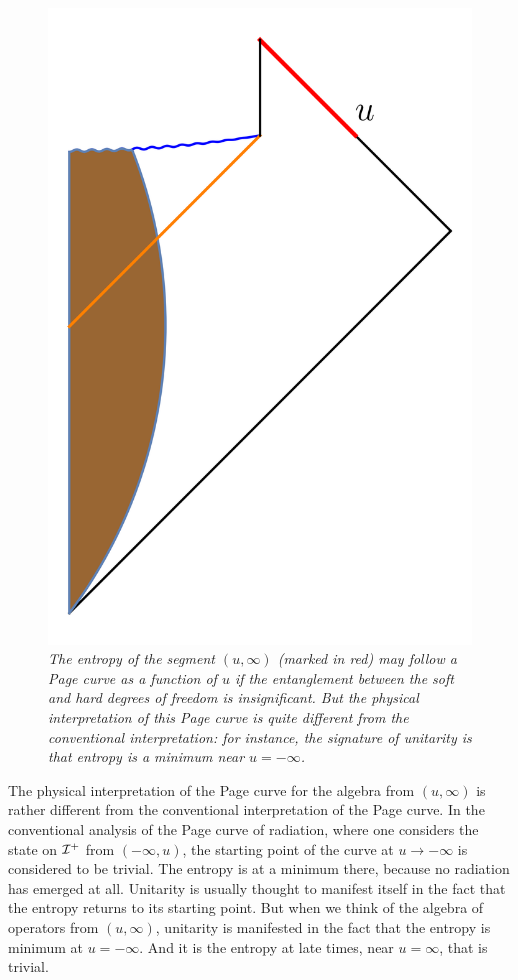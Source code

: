 \documentclass[12pt]{article}
\def \scrip{{\cal I}^{+}}
\begin{document}
\begin{figure}[!ht]
\begin{center}
\includegraphics[height=0.5\textheight]{topalgebra.png}
\caption{\em The entropy of the segment $(u, \infty)$ (marked in red) may follow a Page curve as a function of $u$ if the entanglement between the soft and hard degrees of freedom is insignificant. But the physical interpretation of this Page curve is quite different from the conventional interpretation: for instance, the signature of unitarity is that entropy is a minimum near $u = -\infty$. \label{uppercut}}
\end{center}
\end{figure}

The physical interpretation of the Page curve for the algebra from $(u, \infty)$ is rather different from the conventional interpretation of the Page curve. In the conventional analysis of the Page curve of radiation, where one considers the state on $\scrip$ from $(-\infty, u)$,  the starting point of the curve at $u \rightarrow -\infty$ is considered to be trivial. The entropy is at a minimum there, because no radiation has emerged at all. Unitarity is usually thought to manifest itself in the fact that the entropy returns to its starting point.  But when we think of the algebra of operators from $(u, \infty)$, unitarity is manifested in the fact that the entropy is minimum at $u = -\infty$. And it is the entropy at late times, near $u =  \infty$, that is trivial.
\end{document}
